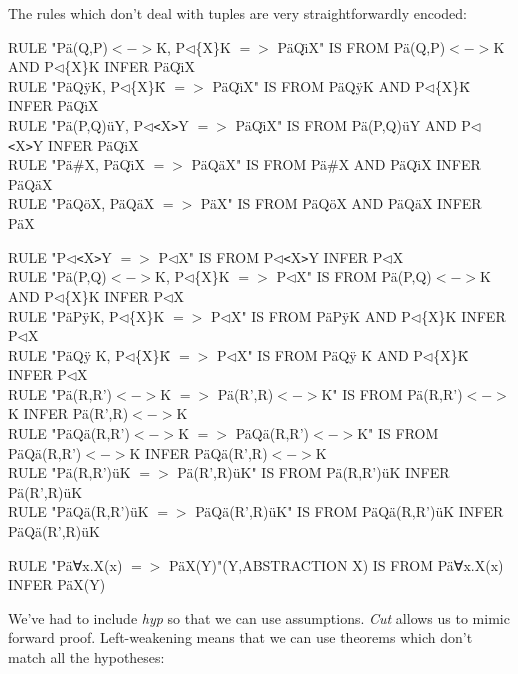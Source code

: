 \documentclass[11pt]{book}
\begin{document}
The rules which don't deal with tuples are very straightforwardly encoded:

RULE "P\"{a}(Q,P)$<->$K, P$\triangleleft$\{X\}K $=>$ P\"{a}Q\"{\i}X" IS FROM P\"{a}(Q,P)$<->$K AND P$\triangleleft$\{X\}K INFER P\"{a}Q\"{\i}X\\
RULE "P\"{a}Q\"{y}K, P$\triangleleft$\{X\}K\={} $=>$ P\"{a}Q\"{\i}X" IS FROM P\"{a}Q\"{y}K AND P$\triangleleft$\{X\}K\={} INFER P\"{a}Q\"{\i}X\\
RULE "P\"{a}(P,Q)\"{u}Y, P$\triangleleft$\texttt{<}X\texttt{>}Y $=>$ P\"{a}Q\"{\i}X" IS FROM P\"{a}(P,Q)\"{u}Y AND P$\triangleleft$\texttt{<}X\texttt{>}Y INFER P\"{a}Q\"{\i}X\\
RULE "P\"{a}\#X, P\"{a}Q\"{\i}X $=>$ P\"{a}Q\"{a}X" IS FROM P\"{a}\#X AND P\"{a}Q\"{\i}X INFER P\"{a}Q\"{a}X\\
RULE "P\"{a}Q\"{o}X, P\"{a}Q\"{a}X $=>$ P\"{a}X" IS FROM P\"{a}Q\"{o}X AND P\"{a}Q\"{a}X INFER P\"{a}X

RULE "P$\triangleleft$\texttt{<}X\texttt{>}Y $=>$ P$\triangleleft$X" IS FROM P$\triangleleft$\texttt{<}X\texttt{>}Y INFER P$\triangleleft$X\\
RULE "P\"{a}(P,Q)$<->$K, P$\triangleleft$\{X\}K $=>$ P$\triangleleft$X" IS FROM P\"{a}(P,Q)$<->$K AND P$\triangleleft$\{X\}K INFER P$\triangleleft$X\\
RULE "P\"{a}P\"{y}K, P$\triangleleft$\{X\}K $=>$ P$\triangleleft$X" IS FROM P\"{a}P\"{y}K AND P$\triangleleft$\{X\}K INFER P$\triangleleft$X\\
RULE "P\"{a}Q\"{y} K, P$\triangleleft$\{X\}K\={} $=>$ P$\triangleleft$X" IS FROM P\"{a}Q\"{y} K AND P$\triangleleft$\{X\}K\={} INFER P$\triangleleft$X\\
RULE "P\"{a}(R,R')$<->$K $=>$ P\"{a}(R',R)$<->$K" IS FROM P\"{a}(R,R')$<->$K INFER P\"{a}(R',R)$<->$K\\
RULE "P\"{a}Q\"{a}(R,R')$<->$K $=>$ P\"{a}Q\"{a}(R,R')$<->$K" IS FROM P\"{a}Q\"{a}(R,R')$<->$K INFER P\"{a}Q\"{a}(R',R)$<->$K\\
RULE "P\"{a}(R,R')\"{u}K $=>$ P\"{a}(R',R)\"{u}K" IS FROM P\"{a}(R,R')\"{u}K INFER P\"{a}(R',R)\"{u}K\\
RULE "P\"{a}Q\"{a}(R,R')\"{u}K $=>$ P\"{a}Q\"{a}(R',R)\"{u}K" IS FROM P\"{a}Q\"{a}(R,R')\"{u}K INFER P\"{a}Q\"{a}(R',R)\"{u}K

RULE "P\"{a}∀x.X(x) $=>$ P\"{a}X(Y)"(Y,ABSTRACTION X) IS FROM P\"{a}∀x.X(x) INFER P\"{a}X(Y)


We've had to include \textit{hyp} so that we can use assumptions. \textit{Cut} allows us to mimic forward proof. Left-weakening means that we can use theorems which don't match all the hypotheses:
\end{document}
